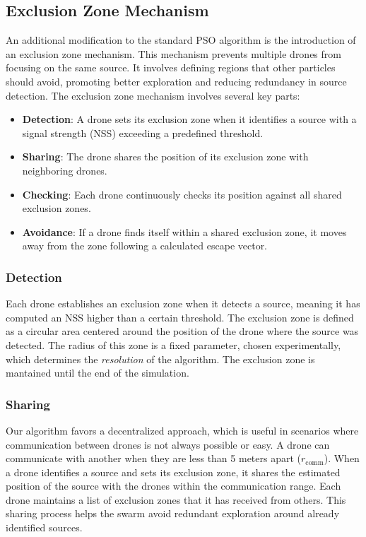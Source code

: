 \subsection{Exclusion Zone Mechanism}
An additional modification to the standard PSO algorithm 
is the introduction of an exclusion zone mechanism.
This mechanism prevents multiple drones from focusing 
on the same source. It involves defining regions that 
other particles should avoid, promoting better exploration 
and reducing redundancy in source detection. The exclusion 
zone mechanism involves several key parts:
\begin{itemize}
    \item \textbf{Detection}: A drone sets its exclusion zone 
    when it identifies a source with a signal strength (NSS) 
    exceeding a predefined threshold.
    \item \textbf{Sharing}: The drone shares the position of 
    its exclusion zone with neighboring drones.
    \item \textbf{Checking}: Each drone continuously checks 
    its position against all shared exclusion zones.
    \item \textbf{Avoidance}: If a drone finds itself within 
    a shared exclusion zone, it moves away from the zone 
    following a calculated escape vector.
\end{itemize}

\subsubsection{Detection}
Each drone establishes an exclusion zone when it detects a 
source, meaning it has computed an NSS higher than a certain 
threshold. The exclusion zone is defined as a circular area 
centered around the position of the drone where the source 
was detected. The radius of this zone is a fixed parameter, 
chosen experimentally, which determines the \textit{resolution} 
of the algorithm. The exclusion zone is mantained until the end 
of the simulation.

\subsubsection{Sharing}
Our algorithm favors a decentralized approach, which is useful 
in scenarios where communication between drones is not always 
possible or easy. A drone can communicate with another when 
they are less than 5 meters apart (\(r_{\text{comm}}\)).
When a drone identifies a source 
and sets its exclusion zone, it shares the estimated position 
of the source with the drones within the communication range. 
Each drone maintains a list of exclusion zones that it has 
received from others. This sharing process helps the swarm 
avoid redundant exploration around already identified sources.

